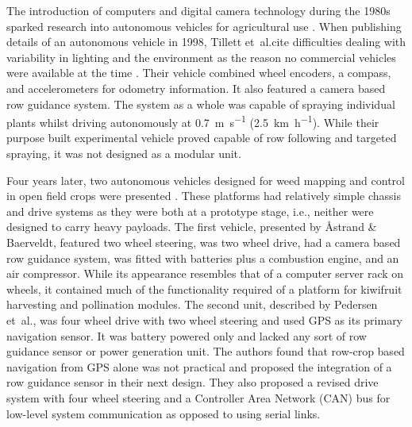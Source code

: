 \documentclass[preprint,authoryear,12pt]{elsarticle}
\begin{document}
        The introduction of computers and digital camera technology during the 1980s sparked research into autonomous vehicles for agricultural use \citep{Li2009}.
        When publishing details of an autonomous vehicle in 1998, Tillett et~al.\@ cite difficulties dealing with variability in lighting and the environment as the reason no commercial vehicles were available at the time \citep{Tillett1998}.
        Their vehicle combined wheel encoders, a compass, and accelerometers for odometry information.
        It also featured a camera based row guidance system.
        The system as a whole was capable of spraying individual plants whilst driving autonomously at \SI{0.7}{\meter\per\second} (\SI{2.5}{\kilo\meter\per\hour}).
        While their purpose built experimental vehicle proved capable of row following and targeted spraying, it was not designed as a modular unit.




        Four years later, two autonomous vehicles designed for weed mapping and control in open field crops were presented \citep{Pedersen2002,Astrand2002}.
        These platforms had relatively simple chassis and drive systems as they were both at a prototype stage, i.e., neither were designed to carry heavy payloads.
        The first vehicle, presented by Åstrand \& Baerveldt, featured two wheel steering, was two wheel drive, had a camera based row guidance system, was fitted with batteries plus a combustion engine, and an air compressor.
        While its appearance resembles that of a computer server rack on wheels, it contained much of the functionality required of a platform for kiwifruit harvesting and pollination modules.
        The second unit, described by Pedersen et~al.\@, was four wheel drive with two wheel steering and used GPS as its primary navigation sensor.
        It was battery powered only and lacked any sort of row guidance sensor or power generation unit.
        The authors found that row-crop based navigation from GPS alone was not practical and proposed the integration of a row guidance sensor in their next design.
        They also proposed a revised drive system with four wheel steering and a Controller Area Network (CAN) bus for low-level system communication as opposed to using serial links.
\end{document}
